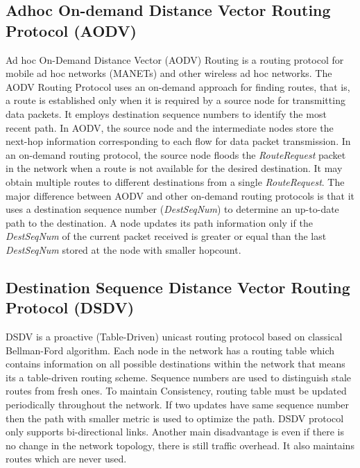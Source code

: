 \documentclass[12pt,a4paper]{report}
\begin{document}
\subsection{Adhoc On-demand Distance Vector Routing Protocol (AODV)}
Ad hoc On-Demand Distance Vector (AODV) Routing is a routing protocol for mobile ad hoc networks (MANETs) and other wireless ad hoc networks. The AODV Routing Protocol uses an on-demand approach for finding routes, that is, a route is established only when it is required by a source node for transmitting data packets. It employs destination sequence numbers to identify the most recent path.  In AODV, the source node and the intermediate nodes store the next-hop information corresponding to each flow for data packet transmission. In an on-demand routing protocol, the source node floods the \textit{RouteRequest} packet in the network when a route is not available for the desired destination. It may obtain multiple routes to different destinations from a single \textit{RouteRequest}. The major difference between AODV and other on-demand routing protocols is that it uses a destination sequence number (\textit{DestSeqNum}) to determine an up-to-date path to the destination. A node updates its path information only if the \textit{DestSeqNum} of the current packet received is greater or equal than the last \textit{DestSeqNum} stored at the node with smaller hopcount.


\subsection{Destination Sequence Distance Vector Routing Protocol (DSDV)}
DSDV is a proactive (Table-Driven) unicast routing protocol based on classical
Bellman-Ford algorithm. Each node in the network has a routing table which contains
information on all possible destinations within the network that means its a table-driven routing
scheme. Sequence numbers are used to distinguish stale routes from fresh ones. To maintain
Consistency, routing table must be updated periodically throughout the network. If two updates
have same sequence number then the path with smaller metric is used to optimize the path.
DSDV protocol only supports bi-directional links. Another main disadvantage is even if there is no change in the network topology, there is still traffic overhead.
It also maintains routes which are never used.
\end{document}
